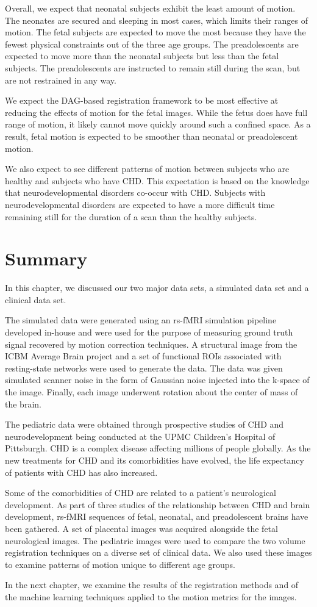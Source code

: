 Overall, we expect that neonatal subjects exhibit the least amount of motion. The neonates are secured and sleeping in most cases, which limits their ranges of motion. The fetal subjects are expected to move the most because they have the fewest physical constraints out of the three age groups. The preadolescents are expected to move more than the neonatal subjects but less than the fetal subjects. The preadolescents are instructed to remain still during the scan, but are not restrained in any way. 

We expect the DAG-based registration framework to be most effective at reducing the effects of motion for the fetal images. While the fetus does have full range of motion, it likely cannot move quickly around such a confined space. As a result, fetal motion is expected to be smoother than neonatal or preadolescent motion.

We also expect to see different patterns of motion between subjects who are healthy and subjects who have CHD. This expectation is based on the knowledge that neurodevelopmental disorders co-occur with CHD. Subjects with neurodevelopmental disorders are expected to have a more difficult time remaining still for the duration of a scan than the healthy subjects.

\section{Summary}

In this chapter, we discussed our two major data sets, a simulated data set and a clinical data set. 

The simulated data were generated using an rs-fMRI simulation pipeline developed in-house and were used for the purpose of measuring ground truth signal recovered by motion correction techniques. A structural image from the ICBM Average Brain project and a set of functional ROIs associated with resting-state networks were used to generate the data. The data was given simulated scanner noise in the form of Gaussian noise injected into the k-space of the image. Finally, each image underwent rotation about the center of mass of the brain.

The pediatric data were obtained through prospective studies of CHD and neurodevelopment being conducted at the UPMC Children's Hospital of Pittsburgh. CHD is a complex disease affecting millions of people globally. As the new treatments for CHD and its comorbidities have evolved, the life expectancy of patients with CHD has also increased. 

Some of the comorbidities of CHD are related to a patient's neurological development. As part of three studies of the relationship between CHD and brain development, rs-fMRI sequences of fetal, neonatal, and preadolescent brains have been gathered. A set of placental images was acquired alongside the fetal neurological images. The pediatric images were used to compare the two volume registration techniques on a diverse set of clinical data. We also used these images to examine patterns of motion unique to different age groups. 

In the next chapter, we examine the results of the registration methods and of the machine learning techniques applied to the motion metrics for the images.
